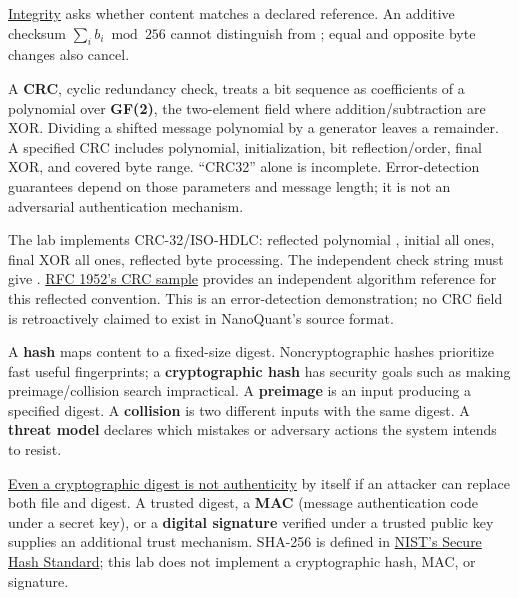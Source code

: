 \hypertarget{01-foundations-i-ch002-correct-decoding-is-not-proof-that-the-bytes-survived}{}

\hyperref[appendix-ed338677de0a]{Integrity} asks whether content matches a declared reference. An additive checksum \(\sum_i b_i\bmod256\) cannot distinguish  from ; equal and opposite byte changes also cancel.

A \textbf{CRC}, cyclic redundancy check, treats a bit sequence as coefficients of a polynomial over \textbf{GF(2)}, the two-element field where addition/subtraction are XOR. Dividing a shifted message polynomial by a generator leaves a remainder. A specified CRC includes polynomial, initialization, bit reflection/order, final XOR, and covered byte range. ``CRC32'' alone is incomplete. Error-detection guarantees depend on those parameters and message length; it is not an adversarial authentication mechanism.

The lab implements CRC-32/ISO-HDLC: reflected polynomial , initial all ones, final XOR all ones, reflected byte processing. The independent check string  must give . \href{https://www.rfc-editor.org/rfc/rfc1952\#section-8}{RFC 1952's CRC sample} provides an independent algorithm reference for this reflected convention. This is an error-detection demonstration; no CRC field is retroactively claimed to exist in NanoQuant's source format.

A \textbf{hash} maps content to a fixed-size digest. Noncryptographic hashes prioritize fast useful fingerprints; a \textbf{cryptographic hash} has security goals such as making preimage/collision search impractical. A \textbf{preimage} is an input producing a specified digest. A \textbf{collision} is two different inputs with the same digest. A \textbf{threat model} declares which mistakes or adversary actions the system intends to resist.

\hyperref[appendix-cbe594d1ab0a]{Even a cryptographic digest is not authenticity} by itself if an attacker can replace both file and digest. A trusted digest, a \textbf{MAC} (message authentication code under a secret key), or a \textbf{digital signature} verified under a trusted public key supplies an additional trust mechanism. SHA-256 is defined in \href{https://csrc.nist.gov/pubs/fips/180-4/upd1/final}{NIST's Secure Hash Standard}; this lab does not implement a cryptographic hash, MAC, or signature.

